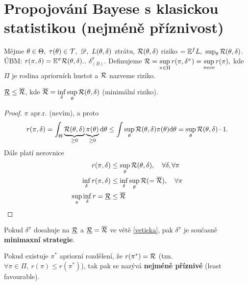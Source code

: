 \section{Propojování Bayese s klasickou statistikou (nejméně příznivost)}
\begin{define}
	Mějme $\theta\in\Theta,~\tau(\theta)\in\mathcal{T},~\mathscr{D},~L(\theta,\delta)$ ztrátu, $\mathcal{R}(\theta,\delta)$ riziko $=\mathbb{E}^fL,~\sup_\theta\mathcal{R}(\theta,\delta)$. ÚBM: $r(\pi,\delta)=\mathbb{E}^\pi\mathcal{R}(\theta,\delta)$.. $\delta_{(B)}^\pi$. Definujeme $\mathcal{R}=\sup\limits_{\pi\in\Pi}r(\pi,\delta^\pi)=\sup\limits_{neco}r(\pi),$ kde $\Pi$ je rodina apriorních hustot a $\mathcal{R}$ nazveme riziko.
\end{define}
\begin{theorem}\label{veticka}
	$\underline{\mathcal{R}}\leq \overline{\mathcal{R}}$, kde $\overline{\mathcal{R}}=\inf\limits_\delta\sup\limits_\theta \mathcal{R}(\theta,\delta)$ (minimální riziko).
	\begin{proof}
		$\pi$ apr.r. (nevím), a proto $$ r(\pi,\delta)=\int_\Theta\underbrace{\mathcal{R}(\theta,\delta)}_{\geq0}\underbrace{\pi(\theta)}_{\geq0}\mathrm{d}\theta\leq \int\sup\limits_\theta \mathcal{R}(\theta,\delta)\pi(\theta)\mathrm{d}\theta=\sup\limits_\theta \mathcal{R}(\theta,\delta)\cdot 1.$$
		Dále platí nerovnice \[
		\begin{split}
		r(\pi,\delta)&\leq \sup\limits_\theta\mathcal{R}(\theta,\delta),\quad \forall\delta,\forall\pi\\
		\inf\limits_\delta r(\pi,\delta)&\leq \inf\limits_\delta\sup\limits_\theta \mathcal{R} (=\overline{\mathcal{R}}),\quad \forall\pi\\
		\sup\limits_\pi\inf\limits_\delta r=\underline{\mathcal{R}}&\leq \overline{\mathcal{R}}
		\end{split}
		\]
	\end{proof}
\end{theorem}
\begin{remark}
	Pokud $\delta^\pi$ dosahuje na $\underline{\mathcal{R}}$ a $\underline{\mathcal{R}}=\overline{\mathcal{R}}$ ve větě \ref{veticka}, pak $\delta^\pi$ je současně \textbf{minimaxní strategie}.
\end{remark}
\begin{define}
	Pokud existuje $\pi^\ast$ apriorní rozdělení, že $r(\pi ^\ast)=\mathcal{R}$ (tzn. $\forall\pi\in\Pi,~r(\pi)\leq r(\pi^\ast)$), tak pak se nazývá \textbf{nejméně příznivé} (least favourable).
\end{define}

